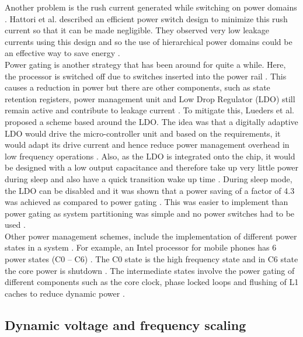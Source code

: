 \documentclass[journal]{IEEEtran}
\begin{document}
Another problem is the rush current generated while switching on power domains \cite{HierarchicalPower}. Hattori et al. \cite{HierarchicalPower} described an efficient power switch design to minimize this rush current so that it can be made negligible. They observed very low leakage currents using this design and so the use of hierarchical power domains could be an effective way to save energy \cite{HierarchicalPower}. \\

Power gating is another strategy that has been around for quite a while. Here, the processor is switched off due to switches inserted into the power rail \cite{LDO}. This causes a reduction in power but there are other components, such as state retention registers, power management unit and Low Drop Regulator (LDO) still remain active and contribute to leakage current \cite{LDO}. To mitigate this, Lueders et al. \cite{LDO} proposed a scheme based around the LDO. The idea was that a digitally adaptive LDO would drive the micro-controller unit and based on the requirements, it would adapt its drive current and hence reduce power management overhead in low frequency operations \cite{LDO}. Also, as the LDO is integrated onto the chip, it would be designed with a low output capacitance and therefore take up very little power during sleep and also have a quick transition wake up time \cite{LDO}. During sleep mode, the LDO can be disabled and it was shown that a power saving of a factor of 4.3 was achieved as compared to power gating \cite{LDO}. This was easier to implement than power gating as system partitioning was simple and no power switches had to be used \cite{LDO}. \\

Other power management schemes, include the implementation of different power states in a system \cite{Intel}. For example, an Intel processor for mobile phones has 6 power states (C0 – C6) \cite{Intel}. The C0 state is the high frequency state and in C6 state the core power is shutdown \cite{Intel}. The intermediate states involve the power gating of different components such as the core clock, phase locked loops and flushing of L1 caches to reduce dynamic power \cite{Intel}.   


\subsection{Dynamic voltage and frequency scaling}
\end{document}

